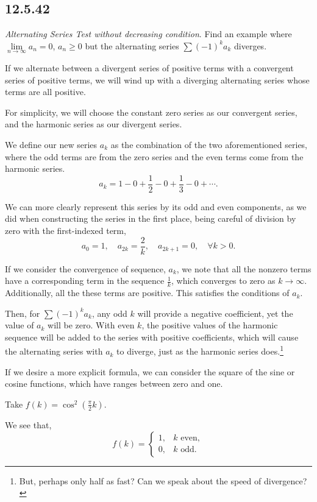 \documentclass[../hw3]{subfiles}
\begin{document}
\subsection*{12.5.42}
\textit{Alternating Series Test without decreasing condition}.
Find an example where $\lim\limits_{n\to\infty}a_n=0$, $a_n\geq0$ but the alternating series $\sum {(-1)}^k a_k$ diverges.

If we alternate between a divergent series of positive terms with a convergent series of positive terms, we will wind up with a diverging alternating series whose terms are all positive. 

For simplicity, we will choose the constant zero series as our convergent series, and the harmonic series as our divergent series. 

We define our new series $a_k$ as the combination of the two aforementioned series, where the odd terms are from the zero series and the even terms come from the harmonic series.
\[a_k=1-0+\frac{1}{2}-0+\frac{1}{3}-0+\cdots.\]

We can more clearly represent this series by its odd and even components, as we did when constructing the series in the first place, being careful of division by zero with the first-indexed term,
\[a_0=1, \quad a_{2k}=\frac{2}{k}, \quad a_{2k+1}=0, \quad \forall k > 0.\]

If we consider the convergence of sequence, $a_k$, we note that all the nonzero terms have a corresponding term in the sequence $\frac{1}{k}$, which converges to zero as $k\to\infty$. Additionally, all the these terms are positive. This satisfies the conditions of $a_k$.

Then, for $\sum {(-1)}^k a_k$, any odd $k$ will provide a negative coefficient, yet the value of $a_k$ will be zero. With even $k$, the positive values of the harmonic sequence will be added to the series with positive coefficients, which will cause the alternating series with $a_k$ to diverge, just as the harmonic series does.\footnote{But, perhaps only half as fast? Can we speak about the speed of divergence?} 

If we desire a more explicit formula, we can consider the square of the sine or cosine functions, which have ranges between zero and one. 

Take $f(k) = \cos^2{\left( \frac{\pi}{2}k \right)}$.

We see that, \[f(k)=\begin{cases}
    1,& k \text{ even}, \\
    0,& k \text{ odd}.
\end{cases}\]
\end{document}
